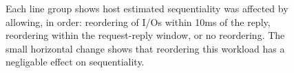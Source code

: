 \begin{figure}
\vspace{-0.1in}
\caption{Each line group shows host estimated sequentiality was affected by allowing, in order: 
reordering of I/Os within 10ms of the
reply, reordering within the request-reply window, or no reordering.
The small horizontal change shows that reordering 
this workload has a negligable effect on sequentiality.}
\label{fig:seq-bytes-compare}
\end{figure}

